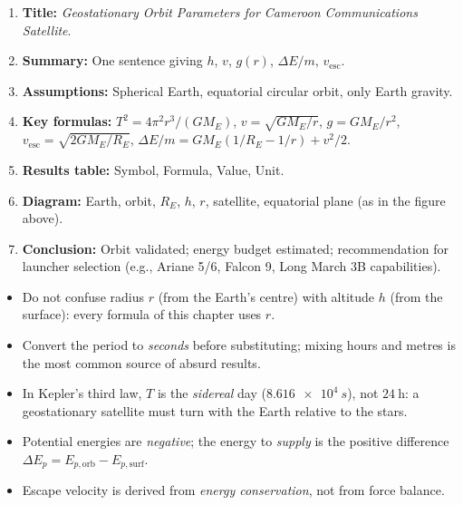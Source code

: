 \documentclass[11pt]{article}
\newcommand{\cle}[1]{{\popxbold\color{popdark}#1}}
\begin{document}
\begin{exoresolu}
\begin{methode}
\begin{enumerate}
\item \textbf{Title:} \emph{Geostationary Orbit Parameters for Cameroon Communications Satellite}.
\item \textbf{Summary:} One sentence giving $h$, $v$, $g(r)$, $\Delta E/m$, $v_{\mathrm{esc}}$.
\item \textbf{Assumptions:} Spherical Earth, equatorial circular orbit, only Earth gravity.
\item \textbf{Key formulas:} $T^2 = 4\pi^2 r^3/(GM_E)$, $v = \sqrt{GM_E/r}$, $g = GM_E/r^2$, $v_{\mathrm{esc}} = \sqrt{2GM_E/R_E}$, $\Delta E/m = GM_E(1/R_E - 1/r) + v^2/2$.
\item \textbf{Results table:} Symbol, Formula, Value, Unit.
\item \textbf{Diagram:} Earth, orbit, $R_E$, $h$, $r$, satellite, equatorial plane (as in the figure above).
\item \textbf{Conclusion:} Orbit validated; energy budget estimated; recommendation for launcher selection (e.g., Ariane 5/6, Falcon 9, Long March 3B capabilities).
\end{enumerate}
\end{methode}

\end{exoresolu}

\begin{attention}
\begin{itemize}
\item Do not confuse \cle{radius} $r$ (from the Earth's centre) with \cle{altitude} $h$ (from the surface): every formula of this chapter uses $r$.
\item Convert the period to \emph{seconds} before substituting; mixing hours and metres is the most common source of absurd results.
\item In Kepler's third law, $T$ is the \emph{sidereal} day ($\SI{8.616e4}{s}$), not $24\ \mathrm{h}$: a geostationary satellite must turn with the Earth relative to the stars.
\item Potential energies are \emph{negative}; the energy to \emph{supply} is the positive difference $\Delta E_{p} = E_{p,\mathrm{orb}} - E_{p,\mathrm{surf}}$.
\item Escape velocity is derived from \emph{energy conservation}, not from force balance.
\end{itemize}
\end{attention}
\end{document}
